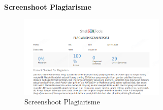 \textbf{Screenshoot Plagiarisme}
\begin{figure}[ht]	
    \includegraphics[width=7cm]{figures/6/1174087/Teori/plg.png}
    \centering
    \caption{Screenshoot Plagiarisme}
\end{figure}
